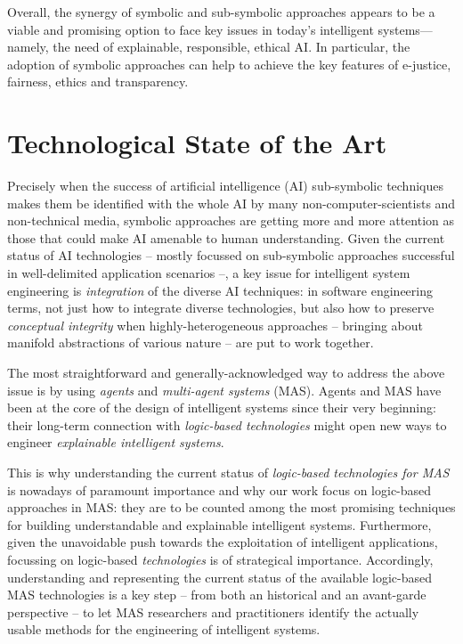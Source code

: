\documentclass[12pt,a4paper,openright,twoside]{book}
\begin{document}
Overall, the synergy of symbolic and sub-symbolic approaches appears to be a viable and promising option to face key issues in today's intelligent systems---namely, the need of explainable, responsible, ethical AI.
%
In particular, the adoption of symbolic approaches can help to achieve the key features of e-justice, fairness, ethics and transparency.

\chapter{Technological State of the Art}


Precisely when the success of artificial intelligence (AI) sub-symbolic techniques makes them be identified with the whole AI by many non-computer-scientists and non-technical media, symbolic approaches are getting more and more attention as those that could make AI amenable to human understanding.
%
Given the current status of AI technologies -- mostly focussed on sub-symbolic approaches successful in well-delimited application scenarios --, a key issue for intelligent system engineering is \emph{integration} of the diverse AI techniques: in software engineering terms, not just how to integrate diverse technologies, but also how to preserve \emph{conceptual integrity} when highly-heterogeneous approaches -- bringing about manifold abstractions of various nature -- are put to work together.

The most straightforward and generally-acknowledged way to address the above issue is by using \emph{agents} and \emph{multi-agent systems} (MAS).
%
Agents and MAS have been at the core of the design of intelligent systems since their very beginning:  their long-term connection with \emph{logic-based technologies} might open new ways to engineer \emph{explainable intelligent systems}.

This is why understanding the current status of \emph{logic-based technologies for MAS} is nowadays of paramount importance and why our work focus on logic-based approaches in MAS: they are to be counted among the most promising techniques for building understandable and explainable intelligent systems.
%
Furthermore, given the unavoidable push towards the exploitation of intelligent applications, focussing on logic-based \emph{technologies} is of strategical importance.
%
Accordingly, understanding and representing the current status of the available logic-based MAS technologies is a key step -- from both an historical and an avant-garde perspective -- to let MAS researchers and practitioners identify the actually usable methods for the engineering of intelligent systems.
\end{document}
